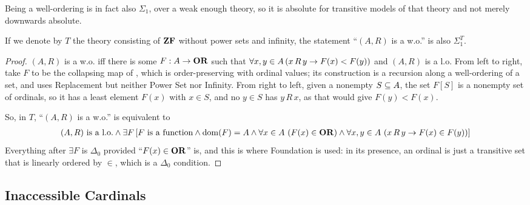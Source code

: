 Being a well-ordering is in fact also $\Sigma_1$, over a weak enough theory, so it is absolute for transitive models of that theory and not merely downwards absolute.

\begin{boxlemma}
    If we denote by $T$ the theory consisting of $\mathbf{ZF}$ without power sets and infinity, the statement ``$(A, R)$ is a w.o.'' is also $\Sigma_1^T$.
\end{boxlemma}
\begin{proof}
    $(A, R)$ is a w.o. iff there is some $F : A \to \mathbf{OR}$ such that $\forall x, y \in A \left( x \, R \, y \to F(x) < F(y) \right)$ %
    and $(A, R)$ is a l.o. From left to right, take $F$ to be the collapsing map of , which is order-preserving with ordinal values; its construction is a recursion along a well-ordering of a set, and uses Replacement but neither Power Set nor Infinity. From right to left, given a nonempty $S \subseteq A$, the set $F[S]$ is a nonempty set of ordinals, so it has a least element $F(x)$ with $x \in S$, and no $y \in S$ has $y \, R \, x$, as that would give $F(y) < F(x)$.

    So, in $T$, ``$(A, R)$ is a w.o.'' is equivalent to
    \begin{align*}
        \text{$(A, R)$ is a l.o.} \land \exists F \left[ F \text{ is a function} \land \operatorname{dom}\!\left( F \right) = A \land \forall x \in A \, \left( F(x) \in \mathbf{OR} \right) \land \forall x, y \in A \, \left( x \, R \, y \to F(x) \in F(y) \right) \right]
    \end{align*}
    Everything after $\exists F$ is $\Delta_0$ provided ``$F(x) \in \mathbf{OR}$'' is, and this is where Foundation is used: in its presence, an ordinal is just a transitive set that is linearly ordered by $\in$, which is a $\Delta_0$ condition.
\end{proof}

\subsection{Inaccessible Cardinals}


